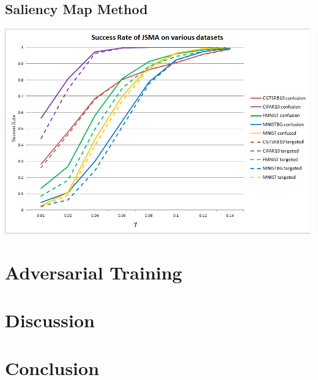 \documentclass{article}
\begin{document}
\subsection{Saliency Map Method}

\includegraphics[scale=0.45]{jsma}

\section{Adversarial Training}


\section{Discussion}


\section{Conclusion}
\end{document}
